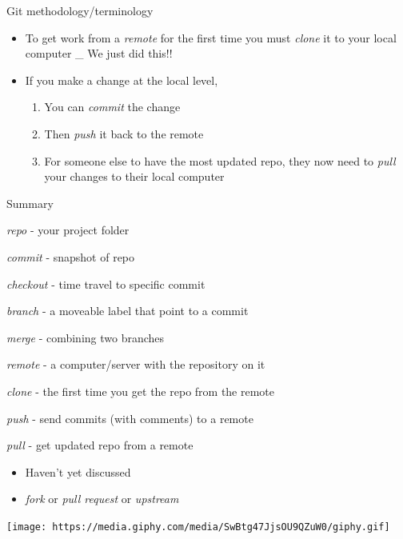 \documentclass[
  ignorenonframetext,
]{beamer}
\providecommand{\tightlist}{%
  \setlength{\itemsep}{0pt}\setlength{\parskip}{0pt}}
\begin{document}
\begin{frame}{Git methodology/terminology}
\protect\hypertarget{git-methodologyterminology-8}{}

\begin{itemize}
\item
  To get work from a \emph{remote} for the first time you must
  \emph{clone} it to your local computer \_ We just did this!!
\item
  If you make a change at the local level,

  \begin{enumerate}
  \tightlist
  \item
    You can \emph{commit} the change
  \item
    Then \emph{push} it back to the remote
  \item
    For someone else to have the most updated repo, they now need to
    \emph{pull} your changes to their local computer
  \end{enumerate}
\end{itemize}

\end{frame}

\begin{frame}{Summary}
\protect\hypertarget{summary}{}

\emph{repo} - your project folder

\emph{commit} - snapshot of repo

\emph{checkout} - time travel to specific commit

\emph{branch} - a moveable label that point to a commit

\emph{merge} - combining two branches

\emph{remote} - a computer/server with the repository on it

\emph{clone} - the first time you get the repo from the remote

\emph{push} - send commits (with comments) to a remote

\emph{pull} - get updated repo from a remote

\begin{itemize}
\tightlist
\item
  Haven't yet discussed
\item
  \emph{fork} or \emph{pull request} or \emph{upstream}
\end{itemize}

\end{frame}

\begin{frame}{}
\protect\hypertarget{section-1}{}

\texttt{[image: https://media.giphy.com/media/SwBtg47JjsOU9QZuW0/giphy.gif]}

\end{frame}
\end{document}
